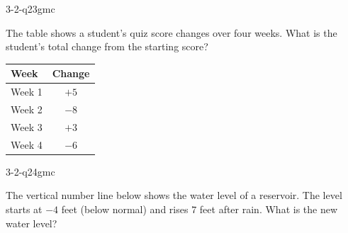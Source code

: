 \begin{practiceQuestion}{3-2-q23}{gmc}
\begin{questionText}
The table shows a student's quiz score changes over four weeks. What is the student's total change from the starting score?

\begin{center}
\begin{tabular}{|l|c|}
\hline
\textbf{Week} & \textbf{Change} \\
\hline
Week 1 & $+5$ \\ \hline
Week 2 & $-8$ \\ \hline
Week 3 & $+3$ \\ \hline
Week 4 & $-6$ \\ \hline
\end{tabular}
\end{center}
\end{questionText}
\end{practiceQuestion}

\begin{practiceQuestion}{3-2-q24}{gmc}
\begin{questionText}
The vertical number line below shows the water level of a reservoir. The level starts at $-4$ feet (below normal) and rises $7$ feet after rain. What is the new water level?

\begin{center}
\end{center}
\end{questionText}
\end{practiceQuestion}

